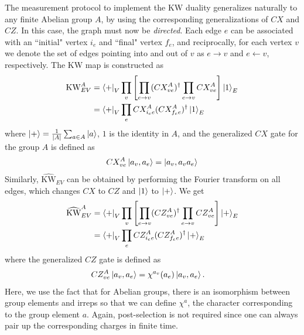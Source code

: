 \documentclass[nofootinbib,prx,twocolumn,showpacs,superscriptaddress,notitlepage,amsmath,amssymb]{revtex4-2}
\theoremstyle{definition}
\def\KW{\text{KW}}
\def\KWd{\widehat{\text{KW}}}
\def\bra#1{\mathinner{\langle{#1}|}}
\def\ket#1{\mathinner{|{#1}\rangle}}
\begin{document}
The measurement protocol to implement the KW duality generalizes naturally to any finite Abelian group $A$, by using the corresponding generalizations of $CX$ and $CZ$. In this case, the graph must now be \textit{directed}. Each edge $e$ can be associated with an ``initial" vertex $i_e$ and ``final" vertex $f_e$, and reciprocally, for each vertex $v$ we denote the set of edges pointing into and out of $v$ as $e\rightarrow v$ and $e\leftarrow v$, respectively. The KW map is constructed as
\begin{align}
    \KW_{EV}^{A} &=  \bra{+}_V \prod_v \left [\prod_{e\rightarrow v} (CX^A_{ve})^\dagger \prod_{e\rightarrow v} CX^A_{ve}\right] \ket{1}_{E}\\
    &= \bra{+}_V \prod_{e} CX^A_{i_ee}  (CX^A_{f_ee})^\dagger \ket{1}_{E}
    \label{eq:KWabelian}
\end{align}
where $\ket{+} = \frac{1}{|A|} \sum_{a \in A} \ket{a}$, $1$ is the identity in $A$, and the generalized $CX$ gate for the group $A$ is defined as
\begin{align}
    CX^A_{ve} \ket{a_v,a_e} = \ket{a_v,a_va_e} 
\end{align}
Similarly, $ \KWd_{EV}$ can be obtained by performing the Fourier transform on all edges, which changes $CX$ to $CZ$ and $\ket{1}$ to $\ket{+}$. We get
\begin{align}
\KWd_{EV}^{A} &=  \bra{+}_V \prod_v \left [\prod_{e\rightarrow v} (CZ^A_{ve})^\dagger \prod_{e\rightarrow v} CZ^A_{ve}\right] \ket{+}_{E}\\
    &= \bra{+}_V \prod_{e} CZ^A_{i_ee}  (CZ^A_{f_ee})^\dagger \ket{+}_{E}
    \label{eq:KWdabelian}
\end{align}
where the generalized $CZ$ gate is defined as
\begin{align}
    CZ^A_{ve}\ket{a_v,a_e} &= \chi^{a_v}(a_e)\ket{a_v,a_e}.
\end{align}
Here, we use the fact that for Abelian groups, there is an isomorphism between group elements and irreps so that we can define $\chi^{a}$, the character corresponding to the group element $a$. Again, post-selection is not required since one can always pair up the corresponding charges in finite time.
\end{document}
